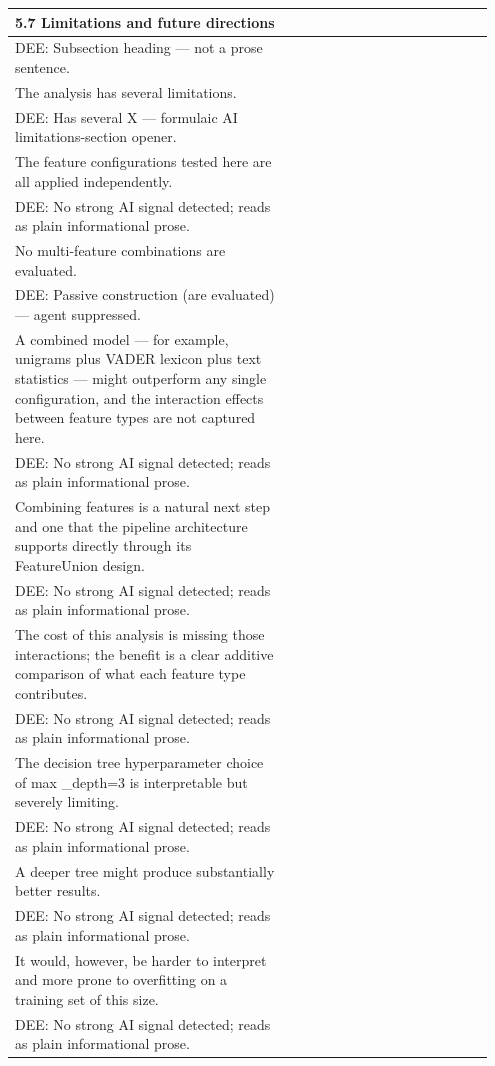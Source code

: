 \documentclass[11pt]{article}
\begin{document}
\begin{longtable}{|p{0.55\linewidth}|p{0.40\linewidth}|}
\hline
5.7 Limitations and future directions & \\[2pt]
\hline
DEE: Subsection heading --- not a prose sentence. & \\
\hline
The analysis has several limitations. & \\[2pt]
\hline
DEE: Has several X --- formulaic AI limitations-section opener. & \\
\hline
The feature configurations tested here are all applied independently. & \\[2pt]
\hline
DEE: No strong AI signal detected; reads as plain informational prose. & \\
\hline
No multi-feature combinations are evaluated. & \\[2pt]
\hline
DEE: Passive construction (are evaluated) --- agent suppressed. & \\
\hline
A combined model --- for example, unigrams plus VADER lexicon plus text statistics --- might outperform any single configuration, and the interaction effects between feature types are not captured here. & \\[2pt]
\hline
DEE: No strong AI signal detected; reads as plain informational prose. & \\
\hline
Combining features is a natural next step and one that the pipeline architecture supports directly through its FeatureUnion design. & \\[2pt]
\hline
DEE: No strong AI signal detected; reads as plain informational prose. & \\
\hline
The cost of this analysis is missing those interactions; the benefit is a clear additive comparison of what each feature type contributes. & \\[2pt]
\hline
DEE: No strong AI signal detected; reads as plain informational prose. & \\
\hline
The decision tree hyperparameter choice of max \_depth=3 is interpretable but severely limiting. & \\[2pt]
\hline
DEE: No strong AI signal detected; reads as plain informational prose. & \\
\hline
A deeper tree might produce substantially better results. & \\[2pt]
\hline
DEE: No strong AI signal detected; reads as plain informational prose. & \\
\hline
It would, however, be harder to interpret and more prone to overfitting on a training set of this size. & \\[2pt]
\hline
DEE: No strong AI signal detected; reads as plain informational prose. & \\

\end{longtable}
\end{document}
